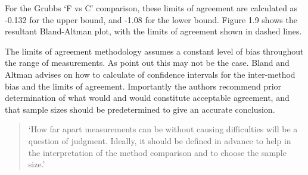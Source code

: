 \documentclass[Main.tex]{subfiles}
\begin{document}


For the Grubbs `F vs C' comparison, these limits
of agreement are calculated as -0.132 for the upper bound, and
-1.08 for the lower bound. Figure 1.9 shows the resultant
Bland-Altman plot, with the limits of agreement shown in dashed
lines.


	
	The limits of agreement methodology assumes a constant level of
	bias throughout the range of measurements. As \citet*{BA86} point
	out this may not be the case. Bland and Altman advises on how to
	calculate of confidence intervals for the inter-method bias and
	the limits of agreement. Importantly the authors recommend prior
	determination of what would and would constitute acceptable
	agreement, and that sample sizes should be predetermined to give
	an accurate conclusion.
	
	\begin{quote}
		`How far apart measurements can be without causing difficulties
		will be a question of judgment. Ideally, it should be defined in
		advance to help in the interpretation of the method comparison and
		to choose the sample size.'\citep{BA86}
	\end{quote}
	
\end{document}
